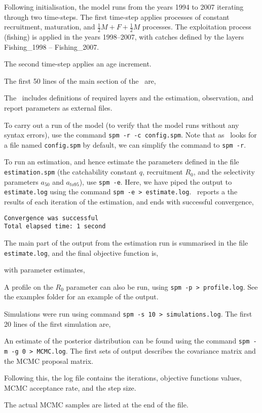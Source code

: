 Following initialisation, the model runs from the years 1994 to 2007 iterating through two time-steps. The first time-step applies processes of constant recruitment, maturation, and  $\frac{1}{2} M + F + \frac{1}{2} M$ processes. The exploitation process (fishing) is applied in the years 1998--2007, with catches defined by the layers Fishing\_1998 -- Fishing\_2007. 

The second time-step applies an age increment.

The first 50 lines of the main section of the \config\ are,
 

The \config\ includes definitions of required layers and the estimation, observation, and report parameters as external files.

To carry out a run of the model (to verify that the model runs without any syntax errors), use the command \texttt{spm -r -c config.spm}. Note that as \SPM\ looks for a file named \texttt{config.spm} by default, we can simplify the command to \texttt{spm -r}. 

To run an estimation, and hence estimate the parameters defined in the file \texttt{estimation.spm} (the catchability constant $q$, recruitment $R_0$, and the selectivity parameters $a_{50}$ and $a_{to95}$), use  \texttt{spm -e}. Here, we have piped the output to \texttt{estimate.log} using the command \texttt{spm -e > estimate.log}.  \SPM\ reports a the results of each iteration of the estimation, and ends with successful convergence,
{\small{\begin{verbatim}
Convergence was successful
Total elapsed time: 1 second
\end{verbatim}}}

The main part of the output from the estimation run is summarised in the file \texttt{estimate.log}, and the final objective function is,
 
with parameter estimates,
 

A profile on the $R_0$ parameter can also be run, using \texttt{spm -p > profile.log}. See the examples folder for an example of the output.

Simulations were run using command \texttt{spm -s 10 > simulations.log}. The first 20 lines of the first simulation are,
 

An estimate of the posterior distribution can be found using the command \texttt{spm -m -g 0 > MCMC.log}. The first sets of output describes the covariance matrix and the MCMC proposal matrix.


Following this, the log file contains the iterations, objective functions values, MCMC acceptance rate, and the step size.


The actual MCMC samples are listed at the end of the file.



